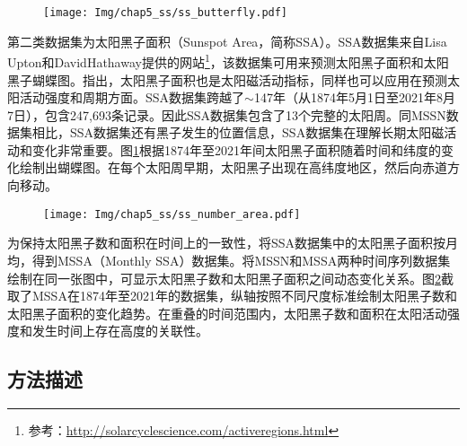 \begin{figure}[!htbp]
  \vspace{-0.3cm}
  \centering
  \texttt{[image: Img/chap5\_ss/ss\_butterfly.pdf]}
  \vspace{-1.4cm}
  \label{fig:ss_butterfly}
\end{figure}

第二类数据集为太阳黑子面积（Sunspot Area，简称SSA）。SSA数据集来自Lisa Upton和DavidHathaway提供的网站\footnote{参考：\href{http://solarcyclescience.com/activeregions.html}{http://solarcyclescience.com/activeregions.html}}，该数据集可用来预测太阳黑子面积和太阳黑子蝴蝶图。\citet{hathaway2015solar}指出，太阳黑子面积也是太阳磁活动指标，同样也可以应用在预测太阳活动强度和周期方面。SSA数据集跨越了$\sim$147年（从1874年5月1日至2021年8月7日），包含247,693条记录。因此SSA数据集包含了13个完整的太阳周。同MSSN数据集相比，SSA数据集还有黑子发生的位置信息，SSA数据集在理解长期太阳磁活动和变化非常重要。图\ref{fig:ss_butterfly}根据1874年至2021年间太阳黑子面积随着时间和纬度的变化绘制出蝴蝶图。在每个太阳周早期，太阳黑子出现在高纬度地区，然后向赤道方向移动。

\begin{figure}[!htbp]
  \vspace{-0.3cm}
  \centering
  \texttt{[image: Img/chap5\_ss/ss\_number\_area.pdf]}
  \vspace{-1.4cm}
  \label{fig:ss_number_area}
\end{figure}

为保持太阳黑子数和面积在时间上的一致性，将SSA数据集中的太阳黑子面积按月均，得到MSSA（Monthly SSA）数据集。将MSSN和MSSA两种时间序列数据集绘制在同一张图中，可显示太阳黑子数和太阳黑子面积之间动态变化关系。图\ref{fig:ss_number_area}截取了MSSA在1874年至2021年的数据集，纵轴按照不同尺度标准绘制太阳黑子数和太阳黑子面积的变化趋势。在重叠的时间范围内，太阳黑子数和面积在太阳活动强度和发生时间上存在高度的关联性。

\subsection{方法描述}\label{subsec:ss_method}

